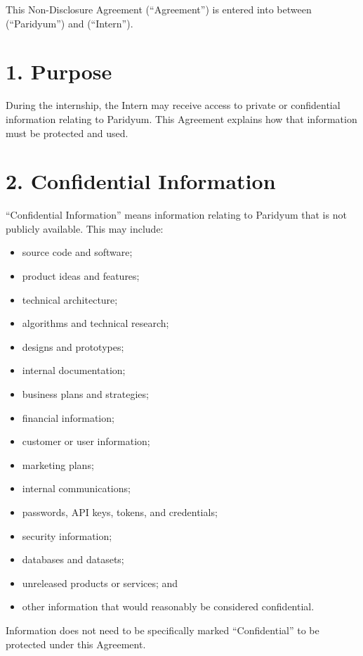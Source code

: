 \documentclass{paridyum}
\begin{document}
\paridyumletterhead
\paridyumdateref{\dkDocDate}{\dkDocRef}

This Non-Disclosure Agreement (``Agreement'') is entered into between
\textbf{\dkOrgName} (``Paridyum'') and \textbf{\dkPIdentityLegalName} (``Intern'').

\section*{1. Purpose}
During the internship, the Intern may receive access to private or confidential
information relating to Paridyum. This Agreement explains how that information
must be protected and used.

\section*{2. Confidential Information}
``Confidential Information'' means information relating to Paridyum that is not
publicly available. This may include:
\begin{itemize}[leftmargin=*, noitemsep]
    \item source code and software;
    \item product ideas and features;
    \item technical architecture;
    \item algorithms and technical research;
    \item designs and prototypes;
    \item internal documentation;
    \item business plans and strategies;
    \item financial information;
    \item customer or user information;
    \item marketing plans;
    \item internal communications;
    \item passwords, API keys, tokens, and credentials;
    \item security information;
    \item databases and datasets;
    \item unreleased products or services; and
    \item other information that would reasonably be considered confidential.
\end{itemize}
Information does not need to be specifically marked ``Confidential'' to be
protected under this Agreement.
\end{document}
